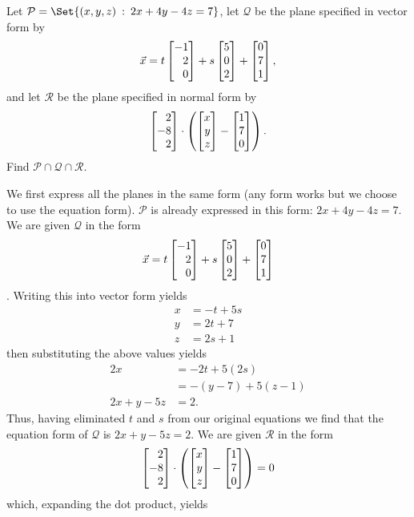 \begin{exercises}
\begin{problist}
		\prob
		Let $\mathcal P=
			\Set{(x,y,z)\given 2x+4y-4z=7}
		$,
		let $\mathcal Q$ be the plane specified in vector form by
		\[
			\vec x = t\mat{-1\\2\\0}+s\mat{5\\0\\2}+\mat{0\\7\\1},
		\]
		and let $\mathcal R$ be the plane specified in normal form by
		\[
			\mat{2\\-8\\2} \cdot \left(\mat{x\\y\\z}-\mat{1\\7\\0}\right).
		\]
		Find $\mathcal P\cap\mathcal Q\cap\mathcal R$.
		\begin{solution}
			We first express all the planes in the same form (any form works but we choose to use the equation form).
			$\mathcal{P}$ is already expressed in this form: $2x+4y-4z=7$.\\
			We are given $\mathcal{Q}$ in the form \[\vec x=t\mat{-1\\2\\0}+s\mat{5\\0\\2}+\mat{0\\7\\1}\].
			Writing this into vector form yields
			\begin{align*}
				x&=-t+5s\\
				y&=2t+7\\
				z&=2s+1
			\end{align*}
			then substituting the above values yields 
			\begin{align*}
				2x&=-2t+5(2s)\\
				&=-(y-7)+5(z-1)\\
				2x+y-5z&=2.
			\end{align*}
			Thus, having eliminated $t$ and $s$ from our original equations we find that the equation form of $\mathcal{Q}$ is $2x+y-5z=2$.
			We are given $\mathcal{R}$ in the form \[\mat{2\\-8\\2}\cdot \left(\mat{x\\y\\z}-\mat{1\\7\\0}\right)=0\]
			which, expanding the dot product, yields 
			\begin{align*}

\end{align*}
\end{solution}
\end{problist}
\end{exercises}
